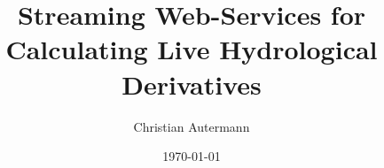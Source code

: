 \documentclass[paper=a4,fontsize=11pt,
			   bibliography=totoc,
			   listof=nochaptergap,
			   listof=notoc]{scrreprt}
\begin{document}
	\title{Streaming Web-Services for Calculating Live Hydrological Derivatives}
	\author{Christian Autermann}
	\date{\today}
	\subject{Master Thesis}
	\begin{spacing}{1}
		\maketitle
	\end{spacing}


	\pagestyle{scrplain}
	{
		\renewcommand\clearpage{}
		\tableofcontents
		\listoffigures
		\lstlistoflistings
		\listoftables
	}
	\clearpage

	\pagestyle{scrheadings}
	
	\clearpage

	
	\clearpage

	\appendix
	
	\clearpage

	
\end{document}
